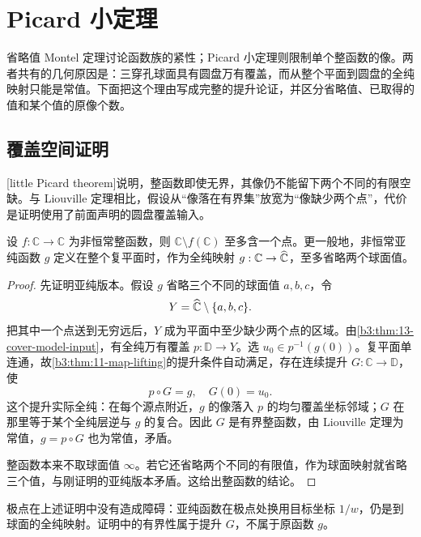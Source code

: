\section{Picard 小定理}
\label{b3:sec:1404}

省略值 Montel 定理讨论函数族的紧性；Picard 小定理则限制单个整函数的像。两者共有的几何原因是：三穿孔球面具有圆盘万有覆盖，而从整个平面到圆盘的全纯映射只能是常值。下面把这个理由写成完整的提升论证，并区分省略值、已取得的值和某个值的原像个数。

\subsection{覆盖空间证明}
\label{b3:subsec:140401}

[little Picard theorem]说明，整函数即使无界，其像仍不能留下两个不同的有限空缺。与 Liouville 定理相比，假设从“像落在有界集”放宽为“像缺少两个点”，代价是证明使用了前面声明的圆盘覆盖输入。

\begin{theorem}\label{b3:thm:14-picard-small}
设 \(f:\mathbb C\to\mathbb C\) 为非恒常整函数，则 \(\mathbb C\setminus f(\mathbb C)\) 至多含一个点。更一般地，非恒常亚纯函数 \(g\) 定义在整个复平面时，作为全纯映射 \(g:\mathbb C\to\widehat{\mathbb C\kern0pt}\)，至多省略两个球面值。
\end{theorem}
\begin{proof}
先证明亚纯版本。假设 \(g\) 省略三个不同的球面值 \(a,b,c\)，令
\[
 Y=\widehat{\mathbb C\kern0pt}\setminus\{a,b,c\}.
\]
把其中一个点送到无穷远后，\(Y\) 成为平面中至少缺少两个点的区域。由\cref{b3:thm:13-cover-model-input}，有全纯万有覆盖 \(p:\mathbb D\to Y\)。选 \(u_0\in p^{-1}(g(0))\)。复平面单连通，故\cref{b3:thm:11-map-lifting}的提升条件自动满足，存在连续提升 \(G:\mathbb C\to\mathbb D\)，使
\[
 p\circ G=g,\quad G(0)=u_0.
\]
这个提升实际全纯：在每个源点附近，\(g\) 的像落入 \(p\) 的均匀覆盖坐标邻域；\(G\) 在那里等于某个全纯层逆与 \(g\) 的复合。因此 \(G\) 是有界整函数，由 Liouville 定理为常值，\(g=p\circ G\) 也为常值，矛盾。

整函数本来不取球面值 \(\infty\)。若它还省略两个不同的有限值，作为球面映射就省略三个值，与刚证明的亚纯版本矛盾。这给出整函数的结论。
\end{proof}
极点在上述证明中没有造成障碍：亚纯函数在极点处换用目标坐标 \(1/w\)，仍是到球面的全纯映射。证明中的有界性属于提升 \(G\)，不属于原函数 \(g\)。


